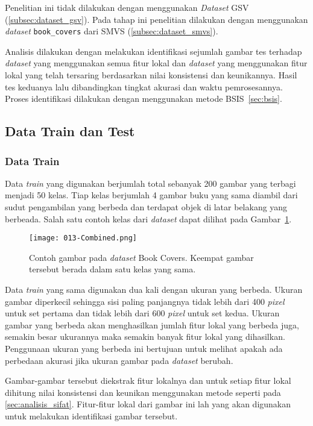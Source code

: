 Penelitian ini tidak dilakukan dengan menggunakan \textit{Dataset} GSV (\ref{subsec:dataset_gsv}). Pada tahap ini penelitian dilakukan dengan menggunakan \textit{dataset} \texttt{book\_covers} dari SMVS (\ref{subsec:dataset_smvs}).

Analisis dilakukan dengan melakukan identifikasi sejumlah gambar tes terhadap \textit{dataset} yang menggunakan semua fitur lokal dan \textit{dataset} yang menggunakan fitur lokal yang telah tersaring berdasarkan nilai konsistensi dan keunikannya. Hasil tes keduanya lalu dibandingkan tingkat akurasi dan waktu pemrosesannya. Proses identifikasi dilakukan dengan menggunakan metode BSIS~\ref{sec:bsis}.

\subsection{Data Train dan Test}
\subsubsection{Data Train}
Data \textit{train} yang digunakan berjumlah total sebanyak 200 gambar yang terbagi menjadi 50 kelas. Tiap kelas berjumlah 4 gambar buku yang sama diambil dari sudut pengambilan yang berbeda dan terdapat objek di latar belakang yang berbeada. Salah satu contoh kelas dari \textit{dataset} dapat dilihat pada Gambar~\ref{fig:contoh_book_covers}.
\begin{figure}[H]
	\centering
	\texttt{[image: 013-Combined.png]}
	\caption{Contoh gambar pada \textit{dataset} Book Covers. Keempat gambar tersebut berada dalam satu kelas yang sama.}
	\label{fig:contoh_book_covers}
\end{figure}

Data \textit{train} yang sama digunakan dua kali dengan ukuran yang berbeda. Ukuran gambar diperkecil sehingga sisi paling panjangnya tidak lebih dari 400 \textit{pixel} untuk set pertama dan tidak lebih dari 600 \textit{pixel} untuk set kedua. Ukuran gambar yang berbeda akan menghasilkan jumlah fitur lokal yang berbeda juga, semakin besar ukurannya maka semakin banyak fitur lokal yang dihasilkan. Penggunaan ukuran yang berbeda ini bertujuan untuk melihat apakah ada perbedaan akurasi jika ukuran gambar pada \textit{dataset} berubah.

Gambar-gambar tersebut diekstrak fitur lokalnya dan untuk setiap fitur lokal dihitung nilai konsistensi dan keunikan menggunakan metode seperti pada \ref{sec:analisis_sifat}. Fitur-fitur lokal dari gambar ini lah yang akan digunakan untuk melakukan identifikasi gambar tersebut.

